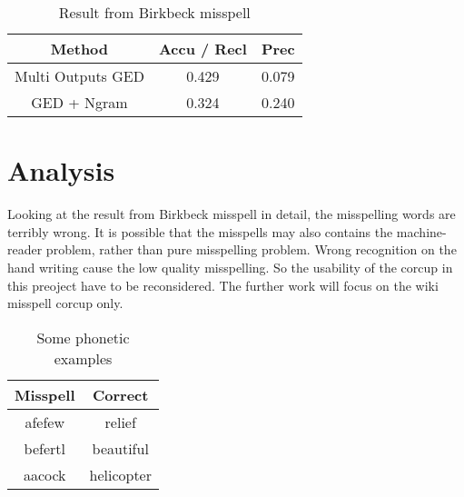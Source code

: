 \documentclass[11pt]{article}
\begin{document}
\begin{table}[h]
\begin{center}
\begin{tabular}{|c|c|c|}

    \hline
    Method & Accu / Recl & Prec\\
	 \hline    
    Multi Outputs GED & 0.429 & 0.079\\
    \hline
    GED + Ngram & 0.324 & 0.240\\
    \hline
\end{tabular}
\caption{Result from Birkbeck misspell}
\label{table2}
\end{center}
\end{table}

\section{Analysis}
Looking at the result from Birkbeck misspell in detail, the misspelling words are terribly wrong. It is possible that the misspells may also contains the machine-reader problem, rather than pure misspelling problem. Wrong recognition on the hand writing cause the low quality misspelling. So the usability of the corcup in this preoject have to be reconsidered. The further work will focus on the wiki misspell corcup only.

\begin{table}[h]
\begin{center}
\begin{tabular}{|c|c|}
    \hline
    Misspell & Correct\\
    \hline
    \hline
    afefew & relief\\
	  \hline    
    befertl & beautiful\\
    \hline
    aacock & helicopter\\
    \hline
\end{tabular}
\caption{Some phonetic examples}
\label{table3}
\end{center}
\end{table}
\end{document}

